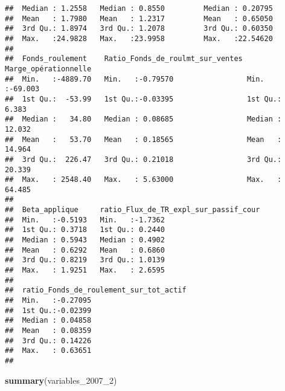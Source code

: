 \documentclass[
]{article}
\newenvironment{Shaded}{\begin{snugshade}}{\end{snugshade}}
\newcommand{\DecValTok}[1]{\textcolor[rgb]{0.00,0.00,0.81}{#1}}
\newcommand{\KeywordTok}[1]{\textcolor[rgb]{0.13,0.29,0.53}{\textbf{#1}}}
\newcommand{\NormalTok}[1]{#1}
\begin{document}
\begin{verbatim}
##  Median : 1.2558   Median : 0.8550         Median : 0.20795  
##  Mean   : 1.7980   Mean   : 1.2317         Mean   : 0.65050  
##  3rd Qu.: 1.8974   3rd Qu.: 1.2078         3rd Qu.: 0.60350  
##  Max.   :24.9828   Max.   :23.9958         Max.   :22.54620  
##                                                              
##  Fonds_roulement    Ratio_Fonds_de_roulmt_sur_ventes Marge_opérationnelle
##  Min.   :-4889.70   Min.   :-0.79570                 Min.   :-69.003     
##  1st Qu.:  -53.99   1st Qu.:-0.03395                 1st Qu.:  6.383     
##  Median :   34.80   Median : 0.08685                 Median : 12.032     
##  Mean   :   53.70   Mean   : 0.18565                 Mean   : 14.964     
##  3rd Qu.:  226.47   3rd Qu.: 0.21018                 3rd Qu.: 20.339     
##  Max.   : 2548.40   Max.   : 5.63000                 Max.   : 64.485     
##                                                                          
##  Beta_applique     ratio_Flux_de_TR_expl_sur_passif_cour
##  Min.   :-0.5193   Min.   :-1.7362                      
##  1st Qu.: 0.3718   1st Qu.: 0.2440                      
##  Median : 0.5943   Median : 0.4902                      
##  Mean   : 0.6292   Mean   : 0.6860                      
##  3rd Qu.: 0.8219   3rd Qu.: 1.0139                      
##  Max.   : 1.9251   Max.   : 2.6595                      
##                                                         
##  ratio_Fonds_de_roulement_sur_tot_actif
##  Min.   :-0.27095                      
##  1st Qu.:-0.02399                      
##  Median : 0.04858                      
##  Mean   : 0.08359                      
##  3rd Qu.: 0.14226                      
##  Max.   : 0.63651                      
## 
\end{verbatim}

\begin{Shaded}
\begin{Highlighting}[]
\KeywordTok{summary}\NormalTok{(variables_}\DecValTok{2007}\NormalTok{_}\DecValTok{2}\NormalTok{)}
\end{Highlighting}
\end{Shaded}
\end{document}
